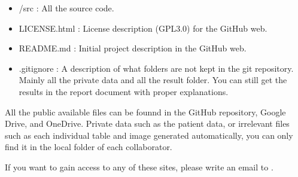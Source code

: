 \begin{itemize}
	\item /src : All the source code.   	
   	   	
    \item LICENSE.html : License description (GPL3.0) for the GitHub web.
    \item README.md : Initial project description in the GitHub web.
    \item .gitignore : A description of what folders are not kept in the git repository. Mainly all the private data and all the result folder. You can still get the results in the report document with proper explanations.

\end{itemize}

All the public available files can be founnd in the GitHub repository, Google Drive, and OneDrive. Private data such as the patient data, or irrelevant files such as each individual table and image generated automatically, you can only find it in the local folder of each collaborator.\vspace{3 mm}

If you want to gain access to any of these sites, please write an email to .\vspace{3 mm}







